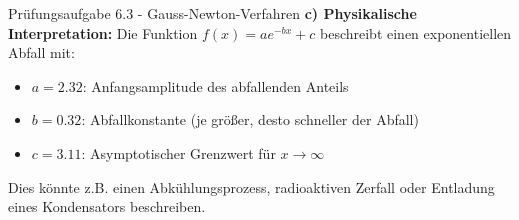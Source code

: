 \begin{example2}{Prüfungsaufgabe 6.3 - Gauss-Newton-Verfahren}
\textbf{c) Physikalische Interpretation:}
Die Funktion $f(x) = ae^{-bx} + c$ beschreibt einen exponentiellen Abfall mit:
\begin{itemize}
    \item $a = 2.32$: Anfangsamplitude des abfallenden Anteils
    \item $b = 0.32$: Abfallkonstante (je größer, desto schneller der Abfall)
    \item $c = 3.11$: Asymptotischer Grenzwert für $x \rightarrow \infty$
\end{itemize}
\vspace{2mm}
Dies könnte z.B. einen Abkühlungsprozess, radioaktiven Zerfall oder Entladung eines Kondensators beschreiben.
\end{example2}


